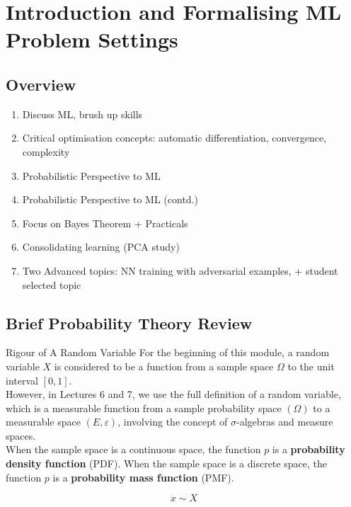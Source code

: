 \chapter{Introduction and Formalising ML Problem Settings}

\section{Overview}
\begin{enumerate}[label=Week \arabic*:, leftmargin=2cm]
    \item Discuss ML, brush up skills
    \item Critical optimisation concepts: automatic differentiation, convergence, complexity
    \item Probabilistic Perspective to ML
    \item Probabilistic Perspective to ML (contd.)
    \item Focus on Bayes Theorem + Practicals
    \item Consolidating learning (PCA study)
    \item Two Advanced topics: NN training with adversarial examples, + student selected topic
\end{enumerate}

\section{Brief Probability Theory Review}
\begin{commentbox}{Rigour of A Random Variable}
    For the beginning of this module, a random variable $X$ is considered to be a function from a sample space $\Omega$ to the unit interval $[0, 1]$. \\

    However, in Lectures 6 and 7, we use the full definition of a random variable, which is a measurable function from a sample probability space $(\Omega)$ to a measurable space $(E, \varepsilon)$, involving the concept of $\sigma$-algebras and measure spaces. \\

    When the sample space is a continuous space, the function $p$ is a \textbf{probability density function} (PDF). When the sample space is a discrete space, the function $p$ is a \textbf{probability mass function} (PMF).
\end{commentbox}
\begin{equation}
    x \sim X
\end{equation}


